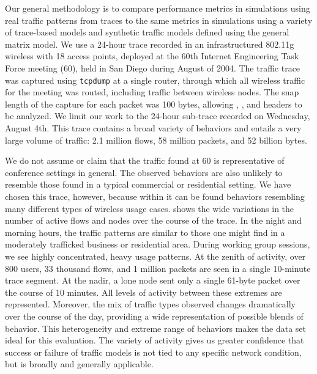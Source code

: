 \documentclass[twocolumn,final]{svjour3}
\begin{document}
Our general methodology is to compare performance metrics in simulations using real traffic patterns from traces to the same metrics in simulations using a variety of trace-based models and synthetic traffic models defined using the general matrix model. We use a 24-hour trace recorded in an infrastructured 802.11g wireless  with 18 access points, deployed at the 60th Internet Engineering Task Force meeting (60), held in San Diego during August of 2004. The traffic trace was captured using \texttt{\small{tcpdump}} at a single router, through which all wireless traffic for the meeting was routed, including traffic between wireless nodes. The snap length of the capture for each packet was 100 bytes, allowing , ,  and  headers to be analyzed. We limit our work to the 24-hour sub-trace recorded on Wednesday, August 4th. This trace contains a broad variety of behaviors and entails a very large volume of traffic: 2.1 million flows, 58 million packets, and 52 billion bytes.

We do not assume or claim that the traffic found at 60 is representative of conference settings in general. The observed behaviors are also unlikely to resemble those found in a typical commercial or residential setting. We have chosen this trace, however, because within it can be found behaviors resembling many different types of wireless usage cases.  shows the wide variations in the number of active flows and nodes over the course of the trace. In the night and morning hours, the traffic patterns are similar to those one might find in a moderately trafficked business or residential area. During working group sessions, we see highly concentrated, heavy usage patterns. At the zenith of activity, over 800 users, 33 thousand flows, and 1 million packets are seen in a single 10-minute trace segment. At the nadir, a lone node sent only a single 61-byte packet over the course of 10 minutes. All levels of activity between these extremes are represented. Moreover, the mix of traffic types observed changes dramatically over the course of the day, providing a wide representation of possible blends of behavior. This heterogeneity and extreme range of behaviors makes the  data set ideal for this evaluation. The variety of activity gives us greater confidence that success or failure of traffic models is not tied to any specific network condition, but is broadly and generally applicable. %
\end{document}
